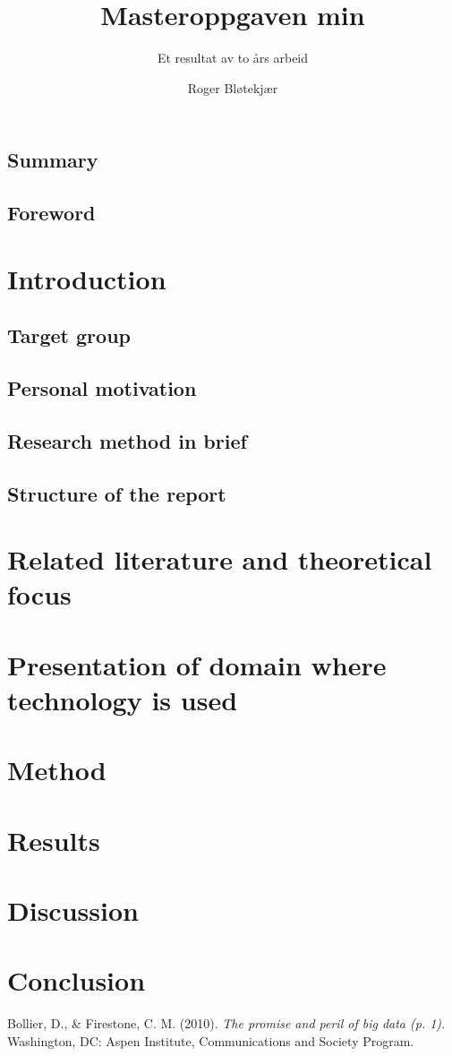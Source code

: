 \documentclass[a4paper,english]{report}
\title{Masteroppgaven min}
\subtitle{Et resultat av to års arbeid}
\author{Roger Bløtekjær}
\begin{document}
	\duoforside[dept={Institutt for informatikk},
	program={Informatikk: språkteknologi},
	short]
	\section{Summary}
	\section{Foreword}
	\tableofcontents
	\chapter{Introduction}
		\section{Target group}
		\section{Personal motivation}
		\section{Research method in brief}
		\section{Structure of the report}
	\chapter{Related literature and theoretical focus}
	\chapter{Presentation of domain where technology is used}
	\chapter{Method}
	\chapter{Results}
	\chapter{Discussion}
	\chapter{Conclusion}
	\begin{thebibliography}{1}
		
		Bollier, D., \& Firestone, C. M. (2010). \emph{The promise and peril of big data (p. 1).} Washington, DC: Aspen Institute, Communications and Society Program.
	\end{thebibliography}
\end{document}
